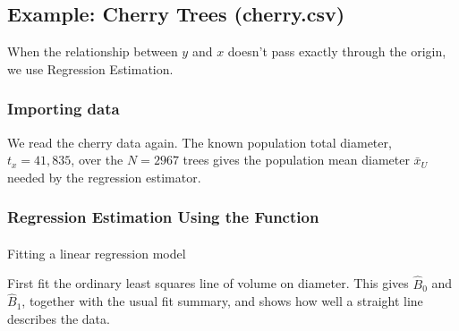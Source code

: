 \documentclass[
  letterpaper,
  DIV=11,
  numbers=noendperiod]{scrreprt}
\makeatletter
\let\oldparagraph\paragraph
\renewcommand{\paragraph}{
    \@ifstar
      \xxxParagraphStar
      \xxxParagraphNoStar
  }
\newcommand{\xxxParagraphStar}[1]{\oldparagraph*{#1}\mbox{}}
\newcommand{\xxxParagraphNoStar}[1]{\oldparagraph{#1}\mbox{}}
\newenvironment{Shaded}{\begin{snugshade}}{\end{snugshade}}
\newcommand{\AttributeTok}[1]{\textcolor[rgb]{0.40,0.45,0.13}{#1}}
\newcommand{\DecValTok}[1]{\textcolor[rgb]{0.68,0.00,0.00}{#1}}
\newcommand{\FunctionTok}[1]{\textcolor[rgb]{0.28,0.35,0.67}{#1}}
\newcommand{\NormalTok}[1]{\textcolor[rgb]{0.00,0.23,0.31}{#1}}
\newcommand{\OtherTok}[1]{\textcolor[rgb]{0.00,0.23,0.31}{#1}}
\newcommand{\SpecialCharTok}[1]{\textcolor[rgb]{0.37,0.37,0.37}{#1}}
\newcommand{\StringTok}[1]{\textcolor[rgb]{0.13,0.47,0.30}{#1}}
\renewcommand{\[}{\begin{equation}}
\renewcommand{\]}{\end{equation}}
\makeatother
\begin{document}
\subsection{Example: Cherry Trees
(cherry.csv)}\label{example-cherry-trees-cherry.csv-1}

When the relationship between \(y\) and \(x\) doesn't pass exactly
through the origin, we use Regression Estimation.

\subsubsection{Importing data}\label{importing-data-1}

We read the cherry data again. The known population total diameter,
\(t_x = 41{,}835\), over the \(N = 2967\) trees gives the population
mean diameter \(\bar x_U\) needed by the regression estimator.

\begin{Shaded}
\end{Shaded}

\subsubsection{Regression Estimation Using the
Function}\label{regression-estimation-using-the-function}

\paragraph{Fitting a linear regression
model}\label{fitting-a-linear-regression-model}

First fit the ordinary least squares line of volume on diameter. This
gives \(\hat B_0\) and \(\hat B_1\), together with the usual fit
summary, and shows how well a straight line describes the data.
\end{document}
